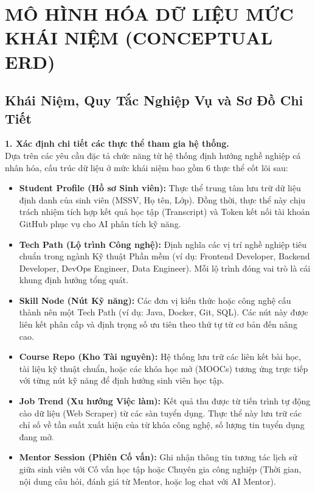 \documentclass{article}
\begin{document}
	
	\section{MÔ HÌNH HÓA DỮ LIỆU MỨC KHÁI NIỆM (CONCEPTUAL ERD)}
	
	\subsection{Khái Niệm, Quy Tắc Nghiệp Vụ và Sơ Đồ Chi Tiết}
	
	\noindent \textbf{1. Xác định chi tiết các thực thể tham gia hệ thống.} \\
	\indent Dựa trên các yêu cầu đặc tả chức năng từ hệ thống định hướng nghề nghiệp cá nhân hóa, cấu trúc dữ liệu ở mức khái niệm bao gồm 6 thực thể cốt lõi sau:
	\begin{itemize}
		\item \textbf{Student Profile (Hồ sơ Sinh viên):} Thực thể trung tâm lưu trữ dữ liệu định danh của sinh viên (MSSV, Họ tên, Lớp). Đồng thời, thực thể này chịu trách nhiệm tích hợp kết quả học tập (Transcript) và Token kết nối tài khoản GitHub phục vụ cho AI phân tích kỹ năng.
		\item \textbf{Tech Path (Lộ trình Công nghệ):} Định nghĩa các vị trí nghề nghiệp tiêu chuẩn trong ngành Kỹ thuật Phần mềm (ví dụ: Frontend Developer, Backend Developer, DevOps Engineer, Data Engineer). Mỗi lộ trình đóng vai trò là cái khung định hướng tổng quát.
		\item \textbf{Skill Node (Nút Kỹ năng):} Các đơn vị kiến thức hoặc công nghệ cấu thành nên một Tech Path (ví dụ: Java, Docker, Git, SQL). Các nút này được liên kết phân cấp và định trọng số ưu tiên theo thứ tự từ cơ bản đến nâng cao.
		\item \textbf{Course Repo (Kho Tài nguyên):} Hệ thống lưu trữ các liên kết bài học, tài liệu kỹ thuật chuẩn, hoặc các khóa học mở (MOOCs) tương ứng trực tiếp với từng nút kỹ năng để định hướng sinh viên học tập.
		\item \textbf{Job Trend (Xu hướng Việc làm):} Kết quả thu được từ tiến trình tự động cào dữ liệu (Web Scraper) từ các sàn tuyển dụng. Thực thể này lưu trữ các chỉ số về tần suất xuất hiện của từ khóa công nghệ, số lượng tin tuyển dụng đang mở.
		\item \textbf{Mentor Session (Phiên Cố vấn):} Ghi nhận thông tin tương tác lịch sử giữa sinh viên với Cố vấn học tập hoặc Chuyên gia công nghiệp (Thời gian, nội dung câu hỏi, đánh giá từ Mentor, hoặc log chat với AI Mentor).
	\end{itemize}
	
\end{document}
